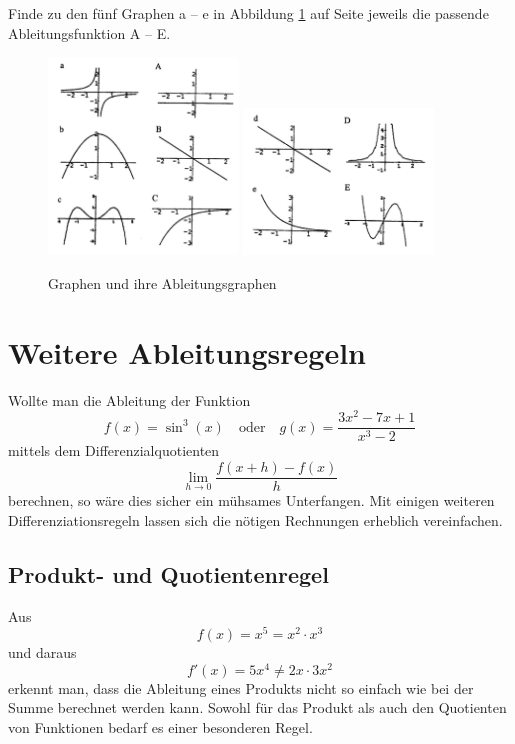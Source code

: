 \documentclass[%
11pt,%
twoside,%
titlepage,%
german,%
headsepline%
]{scrartcl}
\begin{document}
\begin{ueb}[match]
Finde
zu den fünf Graphen a -- e in Abbildung \ref{derive} auf Seite \pageref{derive} jeweils die passende Ableitungsfunktion A -- E.

\begin{figure}
\begin{center}
\includegraphics[width=0.45\textwidth,angle=0.6]{pictures/derivates1}
\includegraphics[width=0.45\textwidth,angle=0.6]{pictures/derivates2}
\end{center}
\caption{Graphen und ihre Ableitungsgraphen}\label{derive}
\end{figure}
\end{ueb}

\section{Weitere Ableitungsregeln}
Wollte man die Ableitung der Funktion
$$f(x)=\sin^3(x)\quad\text{oder}\quad g(x)=\frac{3x^2-7x+1}{x^3-2}$$
mittels dem Differenzialquotienten
$$\lim_{h\to0}\frac{f(x+h)-f(x)}{h}$$
berechnen, so w\"are dies sicher ein m\"uhsames Unterfangen. Mit einigen weiteren Differenziationsregeln lassen sich die n\"otigen Rechnungen erheblich vereinfachen.
\subsection{Produkt- und Quotientenregel}
Aus
$$f(x)=x^5=x^2\cdot x^3$$
und daraus
$$f'(x)=5x^4\neq 2x\cdot3x^2$$
erkennt man, dass die Ableitung eines Produkts nicht so einfach wie bei der Summe berechnet werden kann. Sowohl f\"ur das Produkt als auch den Quotienten von Funktionen bedarf es einer besonderen Regel.
\end{document}
